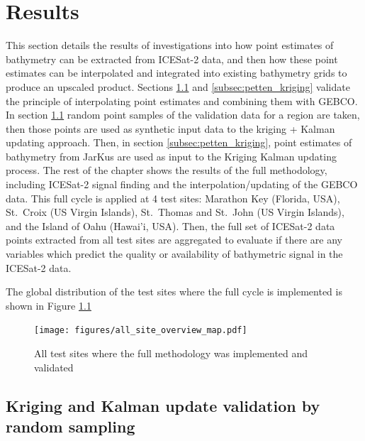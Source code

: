 
\chapter{Results}

This section details the results of investigations into how point estimates of bathymetry can be extracted from ICESat-2 data, and then how these point estimates can be interpolated and integrated into existing bathymetry grids to produce an upscaled product. Sections \ref{subsec:randomsample} and \ref{subsec:petten_kriging} validate the principle of interpolating point estimates and combining them with GEBCO. In section \ref{subsec:randomsample} random point samples of the validation data for a region are taken, then those points are used as synthetic input data to the kriging + Kalman updating approach. Then, in section \ref{subsec:petten_kriging}, point estimates of bathymetry from JarKus are used as input to the Kriging Kalman updating process. The rest of the chapter shows the results of the full methodology, including ICESat-2 signal finding and the interpolation/updating of the GEBCO data. This full cycle is applied at 4 test sites: Marathon Key (Florida, USA), St.~Croix (US Virgin Islands), St.~Thomas and St.~John (US Virgin Islands), and the Island of Oahu (Hawai'i, USA). Then, the full set of ICESat-2 data points extracted from all test sites are aggregated to evaluate if there are any variables which predict the quality or availability of bathymetric signal in the ICESat-2 data.

The global distribution of the test sites where the full cycle is implemented is shown in Figure \ref{fig:world-site-map}

\begin{figure}[!ht]
    \centering
    \texttt{[image: figures/all\_site\_overview\_map.pdf]}
    \caption{All test sites where the full methodology was implemented and validated}
    \label{fig:world-site-map}
\end{figure}

\section{Kriging and Kalman update validation by random sampling}\label{subsec:randomsample}

